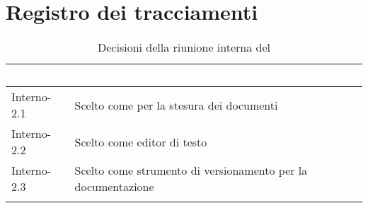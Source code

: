 \section{Registro dei tracciamenti}
{
\renewcommand{\arraystretch}{1.5}
\centering
\begin{longtable}{C{3cm} C{9cm}}
\textcolor{white}{\textbf{Codice}}&
\textcolor{white}{\textbf{Decisione}}\\	
\endhead
		
Interno-2.1 & Scelto  come  per la stesura dei documenti\\

Interno-2.2 & Scelto  come editor di testo\\

Interno-2.3 & Scelto  come strumento di versionamento per la documentazione\\
		
\caption{Decisioni della riunione interna del \Data{}}
\end{longtable}
}
